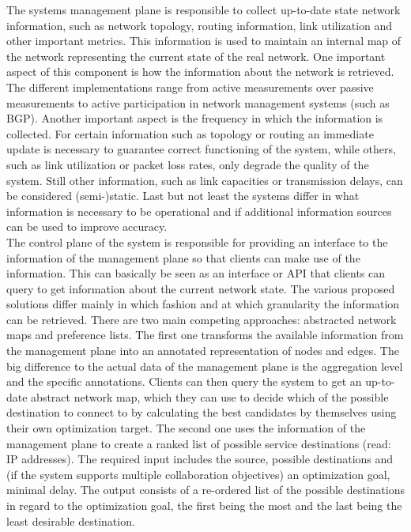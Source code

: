 The systems management plane is responsible to collect up-to-date state network
information, such as network topology, routing information, link utilization
and other important metrics. This information is used to maintain an internal
map of the network representing the current state of the real network.  One
important aspect of this component is how the information about the network is
retrieved. The different implementations range from active measurements over
passive measurements to active participation in network management systems
(such as BGP). Another important aspect is the frequency in which the
information is collected. For certain information such as topology or routing
an immediate update is necessary to guarantee correct functioning of the
system, while others, such as link utilization or packet loss rates, only
degrade the quality of the system. Still other information, such as link
capacities or transmission delays, can be considered (semi-)static.  Last but
not least the systems differ in what information is necessary to be
operational and if additional information sources can be used to improve
accuracy.\\

The control plane of the system is responsible for providing an interface to
the information of the management plane so that clients can make use of the
information. This can basically be seen as an interface or API that clients can
query to get information about the current network state. The various proposed
solutions differ mainly in which fashion and at which granularity the
information can be retrieved. There are two main competing approaches:
abstracted network maps and preference lists. The first one transforms the
available information from the management plane into an annotated
representation of nodes and edges. The big difference to the actual data of the
management plane is the aggregation level and the specific annotations. Clients
can then query the system to get an up-to-date abstract network map, which they
can use to decide which of the possible destination to connect to by
calculating the best candidates by themselves using their own optimization
target. The second one uses the information of the management plane to create a
ranked list of possible service destinations (read: IP addresses). The required
input includes the source, possible destinations and (if the system supports
multiple collaboration objectives) an optimization goal, \eg minimal delay. The
output consists of a re-ordered list of the possible destinations in regard to
the optimization goal, the first being the most and the last being the least
desirable destination.

